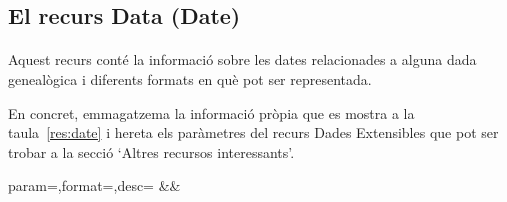 \subsection{El recurs Data (Date)}

    \paragraph{}
    Aquest recurs conté la informació sobre les dates relacionades a alguna dada genealògica i diferents formats en què pot ser representada.

    En concret, emmagatzema la informació pròpia que es mostra a la taula~\ref{res:date} i hereta els paràmetres del recurs Dades Extensibles que pot ser trobar a la secció `Altres recursos interessants'.

    \begin{center}
             {param=\param,format=\format,desc=\desc}
             {\param&\format&\desc}
     \end{center}
